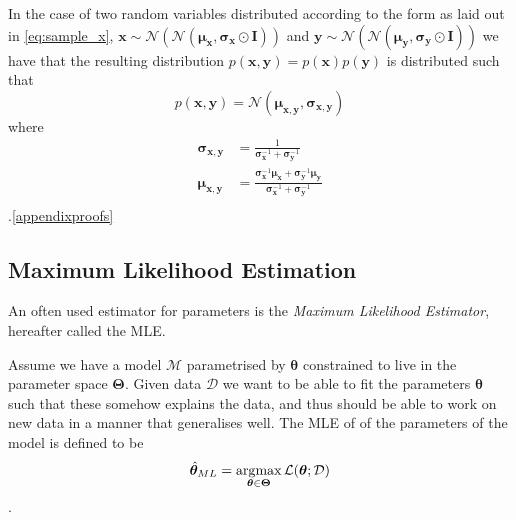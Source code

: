 In the case of two random variables distributed according to the form as laid
out in \ref{eq:sample_x}, $\bm{x} \sim
\mathcal{N}(\mathcal{N}(\bm{\mu}_{\bm{x}}, \bm{\sigma}_{\bm{x}} \odot \bm{I}))$
and $\bm{y} \sim
\mathcal{N}(\mathcal{N}(\bm{\mu}_{\bm{y}}, \bm{\sigma}_{\bm{y}} \odot \bm{I}))$
we have that the resulting distribution $p(\bm{x}, \bm{y}) = p(\bm{x})p(\bm{y})$ is distributed such that
\begin{equation}
  \label{eq:twin_joint_diag_cov}
  p(\bm{x}, \bm{y}) = \mathcal{N}(\bm{\mu}_{\bm{x}, \bm{y}}, \bm{\sigma}_{\bm{x}, \bm{y}})
\end{equation}
where
\begin{align*}
  \bm{\sigma}_{\bm{x}, \bm{y}} & = \frac{1}{\bm{\sigma}_{\bm{x}}^{-1} + \bm{\sigma}_{\bm{y}}^{-1}} \\
  \bm{\mu}_{\bm{x}, \bm{y}} & = \frac{\bm{\sigma}_{\bm{x}}^{-1}\bm{\mu}_{\bm{x}} + \bm{\sigma}_{\bm{y}}^{-1}\bm{\mu}_{\bm{y}}}{\bm{\sigma}_{\bm{x}}^{-1} + \bm{\sigma}_{\bm{y}}^{-1}} \\
\end{align*}.\ref{appendixproofs}

\subsection{Maximum Likelihood Estimation}
An often used estimator for parameters is the \textit{Maximum Likelihood
  Estimator}, hereafter called the MLE.

Assume we have a model $\mathcal{M}$ parametrised by $\bm{\theta}$ constrained
to live in the parameter space $\bm{\Theta}$. Given data $\mathcal{D}$ we want
to be able to fit the parameters $\bm{\theta}$ such that these somehow explains
the data, and thus should be able to work on new data in a manner that
generalises well. The MLE of of the parameters of the model is defined to be
\begin{equation*}
  \hat{\bm{\theta}}_{ML} = \operatorname*{\arg\!\max}_{\bm{\theta} \in \bm{\Theta}}\mathcal{L}(\bm{\theta}; \mathcal{D})
\end{equation*}
.

